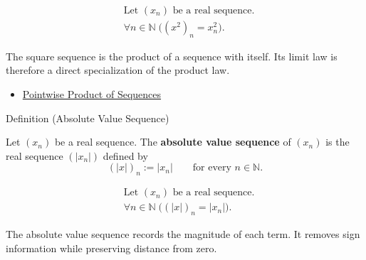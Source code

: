 \begin{remark*}
\[
\begin{aligned}
&\text{Let } (x_n) \text{ be a real sequence.}\\
&\forall n\in\mathbb{N}\;\bigl((x^2)_n=x_n^2\bigr).
\end{aligned}
\]
\end{remark*}

\begin{remark*}[Interpretation]
The square sequence is the product of a sequence with itself. Its limit law is
therefore a direct specialization of the product law.
\end{remark*}

\begin{dependencies}
\begin{itemize}
  \item \hyperref[def:pointwise-product-sequence]{Pointwise Product of Sequences}
\end{itemize}
\end{dependencies}


\begin{definitionbox}{Definition (Absolute Value Sequence)}
\begin{definition}
\label{def:absolute-value-sequence}
Let $(x_n)$ be a real sequence. The \textbf{absolute value sequence} of
$(x_n)$ is the real sequence $(|x_n|)$ defined by
\[
(|x|)_n := |x_n|
\qquad
\text{for every } n\in\mathbb{N}.
\]
\end{definition}
\end{definitionbox}

\begin{remark*}
\[
\begin{aligned}
&\text{Let } (x_n) \text{ be a real sequence.}\\
&\forall n\in\mathbb{N}\;\bigl((|x|)_n=|x_n|\bigr).
\end{aligned}
\]
\end{remark*}

\begin{remark*}[Interpretation]
The absolute value sequence records the magnitude of each term. It removes
sign information while preserving distance from zero.
\end{remark*}

